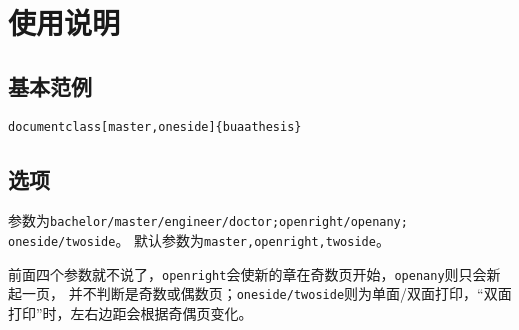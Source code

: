 \chapter{使用说明}
	\section{基本范例}
	\texttt{documentclass[master,oneside]\{buaathesis\}}
	\newpage
	\section{选项}
参数为\texttt{bachelor/master/engineer/doctor;openright/openany; oneside/twoside}。
默认参数为\texttt{master,openright,twoside}。\par
前面四个参数就不说了，\texttt{openright}会使新的章在奇数页开始，\texttt{openany}则只会新起一页，
并不判断是奇数或偶数页；\texttt{oneside/twoside}则为单面/双面打印，“双面打印”时，左右边距会根据奇偶页变化。
